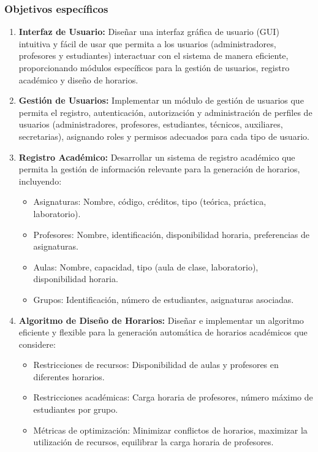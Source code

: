 \documentclass{article} %
\begin{document}
    \subsubsection{Objetivos específicos}
    \begin{enumerate}[font=\bfseries] %
        \item \textbf{Interfaz de Usuario:} Diseñar una interfaz gráfica de usuario (GUI) intuitiva y fácil de usar que permita a los usuarios (administradores, profesores y estudiantes) interactuar con el sistema de manera eficiente, proporcionando módulos específicos para la gestión de usuarios, registro académico y diseño de horarios.
        \item \textbf{Gestión de Usuarios:} Implementar un módulo de gestión de usuarios que permita el registro, autenticación, autorización y administración de perfiles de usuarios (administradores, profesores, estudiantes, técnicos, auxiliares, secretarias), asignando roles y permisos adecuados para cada tipo de usuario.
        \item \textbf{Registro Académico:} Desarrollar un sistema de registro académico que permita la gestión de información relevante para la generación de horarios, incluyendo:
        \begin{itemize}
            \item Asignaturas: Nombre, código, créditos, tipo (teórica, práctica, laboratorio).
            \item Profesores: Nombre, identificación, disponibilidad horaria, preferencias de asignaturas.
            \item Aulas: Nombre, capacidad, tipo (aula de clase, laboratorio), disponibilidad horaria.
            \item Grupos: Identificación, número de estudiantes, asignaturas asociadas.
        \end{itemize}
        \item \textbf{Algoritmo de Diseño de Horarios:} Diseñar e implementar un algoritmo eficiente y flexible para la generación automática de horarios académicos que considere:
        \begin{itemize}
            \item Restricciones de recursos: Disponibilidad de aulas y profesores en diferentes horarios.
            \item Restricciones académicas: Carga horaria de profesores, número máximo de estudiantes por grupo.
            \item Métricas de optimización: Minimizar conflictos de horarios, maximizar la utilización de recursos, equilibrar la carga horaria de profesores.

\end{itemize}
\end{enumerate}
\end{document}
